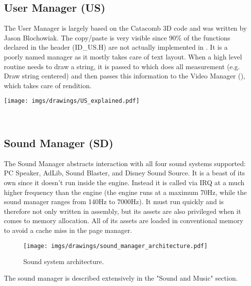 \documentclass[book.tex]{subfiles}
\begin{document}
\subsection{User Manager (US)}
\begin{minipage}{0.7\textwidth}
The User Manager is largely based on the Catacomb 3D code and was written by Jason Blochowiak. The copy/paste is very visible since 90\% of the functions declared in the header (ID\_US.H) are not actually implemented in . 
It is a poorly named manager as it mostly takes care of text layout. When a  high level routine needs to draw a string, it is passed to  which does all measurement (e.g. Draw string centered)
and then passes this information to the Video Manager (), which takes care of rendition.
\end{minipage}
\begin{minipage}{0.3\textwidth}
\begin{flushright}
\texttt{[image: imgs/drawings/US\_explained.pdf]}
\end{flushright}
\end{minipage}
\noindent
\\












\subsection{Sound Manager (SD)}
The Sound Manager abstracts interaction with all four sound systems supported: PC Speaker, AdLib, Sound Blaster, and Disney Sound Source. It is a beast of its own since it doesn't run inside the engine. Instead it is called via IRQ at a much higher frequency than the engine (the engine runs at a maximum 70Hz, while the sound manager ranges from 140Hz to 7000Hz). It must run quickly and is therefore not only written in assembly, but its assets are also privileged when it comes to memory allocation. All of its assets are loaded in conventional memory to avoid a cache miss in the page manager.\\
 \par
\begin{figure}[H]
\centering
 \texttt{[image: imgs/drawings/sound\_manager\_architecture.pdf]}
 \caption{Sound system architecture.}
 \end{figure}
 \par
The sound manager is described extensively in the "Sound and Music" section.
\end{document}
